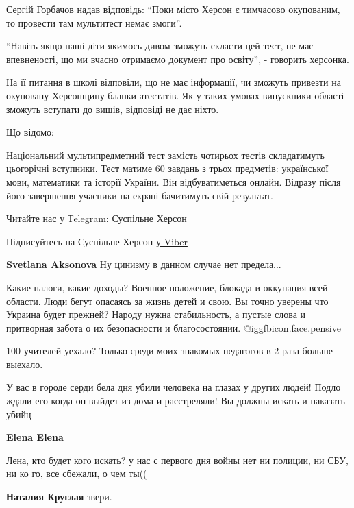 \begin{itemize}
\begin{multicols}{2}
Сергій Горбачов надав відповідь: \enquote{Поки місто Херсон є тимчасово окупованим, то
провести там мультитест немає змоги}.

\enquote{Навіть якщо наші діти якимось дивом зможуть скласти цей тест, не має
впевненості, що ми вчасно отримаємо документ про освіту}, - говорить херсонка.

На її питання в школі відповіли, що не має інформації, чи зможуть привезти на
окуповану Херсонщину бланки атестатів. Як у таких умовах випускники області
зможуть вступати до вишів, відповіді не дає ніхто.

Що відомо:

Національний мультипредметний тест замість чотирьох тестів складатимуть
цьогорічні вступники. Тест матиме 60 завдань з трьох предметів: української
мови, математики та історії України. Він відбуватиметься онлайн. Відразу
після його завершення учасники на екрані бачитимуть свій результат.

Читайте нас у Тelegram: \href{https://t.me/suspilnekherson}{Суспільне Херсон}

Підписуйтесь на Суспільне Херсон \href{https://bit.ly/3lCV2Je}{у Viber}

\end{multicols} %

\textbf{Svetlana Aksonova} Ну цинизму в данном случае нет предела...


Какие налоги, какие доходы? Военное положение, блокада и оккупация всей
области. Люди бегут опасаясь за жизнь детей и свою. Вы точно уверены что
Украина будет прежней? Народу нужна стабильность, а пустые слова и притворная
забота о их безопасности и благосостоянии. @igg{fbicon.face.pensive} 

100 учителей уехало? Только среди моих знакомых педагогов в 2 раза больше выехало.


У вас в городе серди бела дня убили человека на глазах у других людей! Подло
ждали его когда он выйдет из дома и расстреляли! Вы должны искать и наказать
убийц

\begin{itemize} %
\textbf{Elena Elena} 

Лена, кто будет кого искать? у нас с первого дня войны нет ни полиции, ни СБУ, ни ко го, все сбежали, о чем ты((

\textbf{Наталия Круглая} звери.


\end{itemize}
\end{itemize}
